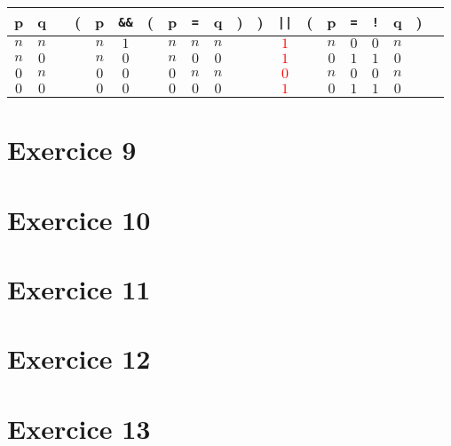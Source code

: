 \documentclass[a4paper,11pt]{report}
\begin{document}
\begin{center}
  \begin{tabular}{@{ }c@{ }@{ }c | c@{ }@{}c@{}@{ }c@{ }@{ }c@{ }@{}c@{}@{ }c@{ }@{ }c@{ }@{ }c@{ }@{}c@{}@{}c@{}@{ }c@{ }@{}c@{}@{ }c@{ }@{ }c@{ }@{ }c@{ }@{ }c@{ }@{}c@{}@{ }c}
    p & q &  & ( & p & \verb+&&+ & ( & p & \verb+=+ & q & ) & ) & \verb+||+ & ( & p & \verb+=+ & \verb+!+ & q & ) & \\
    \hline 
    $n$ & $n$ &  &  & $n$ & $1$ &  & $n$ & $n$ & $n$ &  &  & \textcolor{red}{$1$} &  & $n$ & $0$ & $0$ & $n$ &  & \\
    $n$ & $0$ &  &  & $n$ & $0$ &  & $n$ & $0$ & $0$ &  &  & \textcolor{red}{$1$} &  & $0$ & $1$ & $1$ & $0$ &  & \\
    $0$ & $n$ &  &  & $0$ & $0$ &  & $0$ & $n$ & $n$ &  &  & \textcolor{red}{$0$} &  & $n$ & $0$ & $0$ & $n$ &  & \\
    $0$ & $0$ &  &  & $0$ & $0$ &  & $0$ & $0$ & $0$ &  &  & \textcolor{red}{$1$} &  & $0$ & $1$ & $1$ & $0$ &  & \\
  \end{tabular}
\end{center}

\section*{Exercice 9}

\section*{Exercice 10}

\section*{Exercice 11}

\section*{Exercice 12}

\section*{Exercice 13}
    
\end{document}
